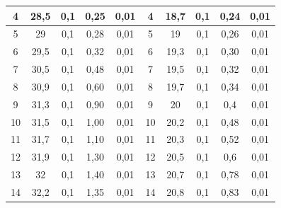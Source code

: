 \documentclass[a4paper,12pt]{article}
\begin{document}
\begin{enumerate}
\begin{table}[h]
\begin{tabular}{ccccc||c|c|c|c|c|}
\multicolumn{1}{|c|}{4}   & \multicolumn{1}{c|}{28,5}     & \multicolumn{1}{c|}{0,1}             & \multicolumn{1}{c|}{0,25}   & 0,01                  & 4   & 18,7   & 0,1             & 0,24 & 0,01          \\ \hline
\multicolumn{1}{|c|}{5}   & \multicolumn{1}{c|}{29}       & \multicolumn{1}{c|}{0,1}             & \multicolumn{1}{c|}{0,28}   & 0,01                  & 5   & 19     & 0,1             & 0,26 & 0,01          \\ \hline
\multicolumn{1}{|c|}{6}   & \multicolumn{1}{c|}{29,5}     & \multicolumn{1}{c|}{0,1}             & \multicolumn{1}{c|}{0,32}   & 0,01                  & 6   & 19,3   & 0,1             & 0,30 & 0,01          \\ \hline
\multicolumn{1}{|c|}{7}   & \multicolumn{1}{c|}{30,5}     & \multicolumn{1}{c|}{0,1}             & \multicolumn{1}{c|}{0,48}   & 0,01                  & 7   & 19,5   & 0,1             & 0,32 & 0,01          \\ \hline
\multicolumn{1}{|c|}{8}   & \multicolumn{1}{c|}{30,9}     & \multicolumn{1}{c|}{0,1}             & \multicolumn{1}{c|}{0,60}   & 0,01                  & 8   & 19,7   & 0,1             & 0,34 & 0,01          \\ \hline
\multicolumn{1}{|c|}{9}   & \multicolumn{1}{c|}{31,3}     & \multicolumn{1}{c|}{0,1}             & \multicolumn{1}{c|}{0,90}   & 0,01                  & 9   & 20     & 0,1             & 0,4  & 0,01          \\ \hline
\multicolumn{1}{|c|}{10}  & \multicolumn{1}{c|}{31,5}     & \multicolumn{1}{c|}{0,1}             & \multicolumn{1}{c|}{1,00}   & 0,01                  & 10  & 20,2   & 0,1             & 0,48 & 0,01          \\ \hline
\multicolumn{1}{|c|}{11}  & \multicolumn{1}{c|}{31,7}     & \multicolumn{1}{c|}{0,1}             & \multicolumn{1}{c|}{1,10}   & 0,01                  & 11  & 20,3   & 0,1             & 0,52 & 0,01          \\ \hline
\multicolumn{1}{|c|}{12}  & \multicolumn{1}{c|}{31,9}     & \multicolumn{1}{c|}{0,1}             & \multicolumn{1}{c|}{1,30}   & 0,01                  & 12  & 20,5   & 0,1             & 0,6  & 0,01          \\ \hline
\multicolumn{1}{|c|}{13}  & \multicolumn{1}{c|}{32}       & \multicolumn{1}{c|}{0,1}             & \multicolumn{1}{c|}{1,40}   & 0,01                  & 13  & 20,7   & 0,1             & 0,78 & 0,01          \\ \hline
\multicolumn{1}{|c|}{14}  & \multicolumn{1}{c|}{32,2}     & \multicolumn{1}{c|}{0,1}             & \multicolumn{1}{c|}{1,35}   & 0,01                  & 14  & 20,8   & 0,1             & 0,83 & 0,01          \\ \hline

\end{tabular}
\end{table}
\end{enumerate}
\end{document}

